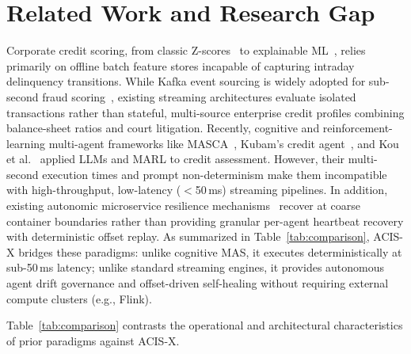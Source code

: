 \documentclass[runningheads]{llncs}
\begin{document}
\section{Related Work and Research Gap}
\label{sec:related}
Corporate credit scoring, from classic Z-scores~\cite{altman1968financial} to explainable ML~\cite{chang2025explainable,nwafor2024hybrid}, relies primarily on offline batch feature stores incapable of capturing intraday delinquency transitions. While Kafka event sourcing is widely adopted for sub-second fraud scoring~\cite{kesarpu2025kafka,parnerkar2025eda}, existing streaming architectures evaluate isolated transactions rather than stateful, multi-source enterprise credit profiles combining balance-sheet ratios and court litigation. 
Recently, cognitive and reinforcement-learning multi-agent frameworks like MASCA~\cite{jajoo2025masca}, Kubam's credit agent~\cite{kubam2026agentic}, and Kou et al.~\cite{kou2025learning} applied LLMs and MARL to credit assessment. However, their multi-second execution times and prompt non-determinism make them incompatible with high-throughput, low-latency ($<$50\,ms) streaming pipelines. In addition, existing autonomic microservice resilience mechanisms~\cite{beereddy2025selfhealing,kephart2003autonomic} recover at coarse container boundaries rather than providing granular per-agent heartbeat recovery with deterministic offset replay. As summarized in Table~\ref{tab:comparison}, ACIS-X bridges these paradigms: unlike cognitive MAS, it executes deterministically at sub-50\,ms latency; unlike standard streaming engines, it provides autonomous agent drift governance and offset-driven self-healing without requiring external compute clusters (e.g., Flink).

Table~\ref{tab:comparison} contrasts the operational and architectural characteristics of prior paradigms against ACIS-X. 
\end{document}
